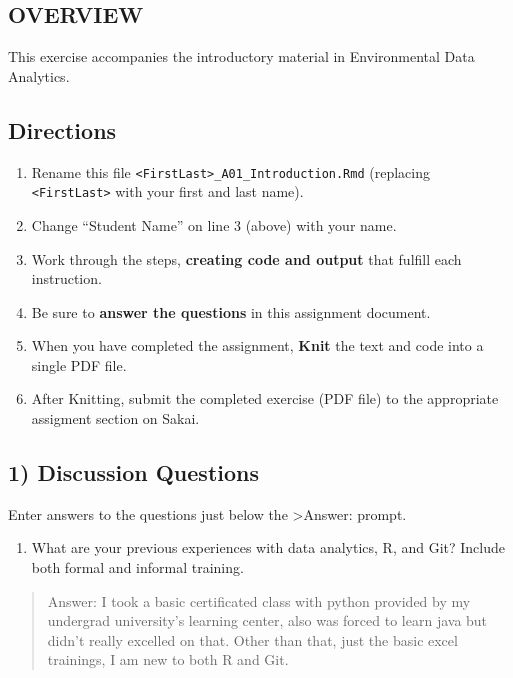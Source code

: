\documentclass[
]{article}
\author{Yin-Chia Yang}
\date{}
\providecommand{\tightlist}{%
  \setlength{\itemsep}{0pt}\setlength{\parskip}{0pt}}
\begin{document}
\hypertarget{overview}{%
\subsection{OVERVIEW}\label{overview}}

This exercise accompanies the introductory material in Environmental
Data Analytics.

\hypertarget{directions}{%
\subsection{Directions}\label{directions}}

\begin{enumerate}
\def\labelenumi{\arabic{enumi}.}
\tightlist
\item
  Rename this file
  \texttt{\textless{}FirstLast\textgreater{}\_A01\_Introduction.Rmd}
  (replacing \texttt{\textless{}FirstLast\textgreater{}} with your first
  and last name).
\item
  Change ``Student Name'' on line 3 (above) with your name.
\item
  Work through the steps, \textbf{creating code and output} that fulfill
  each instruction.
\item
  Be sure to \textbf{answer the questions} in this assignment document.
\item
  When you have completed the assignment, \textbf{Knit} the text and
  code into a single PDF file.
\item
  After Knitting, submit the completed exercise (PDF file) to the
  appropriate assigment section on Sakai.
\end{enumerate}

\hypertarget{discussion-questions}{%
\subsection{1) Discussion Questions}\label{discussion-questions}}

Enter answers to the questions just below the \textgreater Answer:
prompt.

\begin{enumerate}
\def\labelenumi{\arabic{enumi}.}
\tightlist
\item
  What are your previous experiences with data analytics, R, and Git?
  Include both formal and informal training.
\end{enumerate}

\begin{quote}
Answer: I took a basic certificated class with python provided by my
undergrad university's learning center, also was forced to learn java
but didn't really excelled on that. Other than that, just the basic
excel trainings, I am new to both R and Git.
\end{quote}
\end{document}
